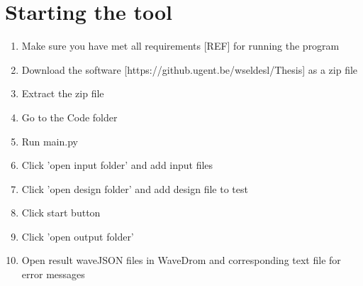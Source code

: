 \section{Starting the tool}
\begin{enumerate}
	\item 	Make sure you have met all requirements [REF] for running the program 
	\item Download the software [https://github.ugent.be/wseldesl/Thesis] as a zip file
	\item Extract the zip file
	\item Go to the Code folder
	\item Run main.py
	\item Click 'open input folder' and add input files
	\item Click 'open design folder' and add design file to test
	\item Click start button
	\item Click 'open output folder'
	\item Open result waveJSON files in WaveDrom and corresponding text file for error messages
\end{enumerate}

	

